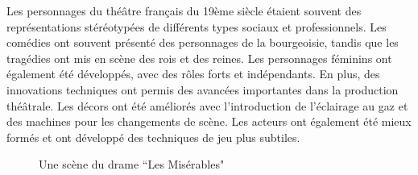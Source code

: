 \documentclass[UTF8,a4paper,12pt]{ctexart}
\numberwithin{equation}{section}
\begin{document}
Les personnages du théâtre français du 19ème siècle étaient souvent des représentations stéréotypées de différents types sociaux et professionnels. Les comédies ont souvent présenté des personnages de la bourgeoisie, tandis que les tragédies ont mis en scène des rois et des reines. Les personnages féminins ont également été développés, avec des rôles forts et indépendants. En plus, des innovations techniques ont permis des avancées importantes dans la production théâtrale. Les décors ont été améliorés avec l'introduction de l'éclairage au gaz et des machines pour les changements de scène. Les acteurs ont également été mieux formés et ont développé des techniques de jeu plus subtiles.
\begin{figure}[H] 
\caption{Une scène du drame ``Les Misérables"}
\end{figure}
\end{document}

